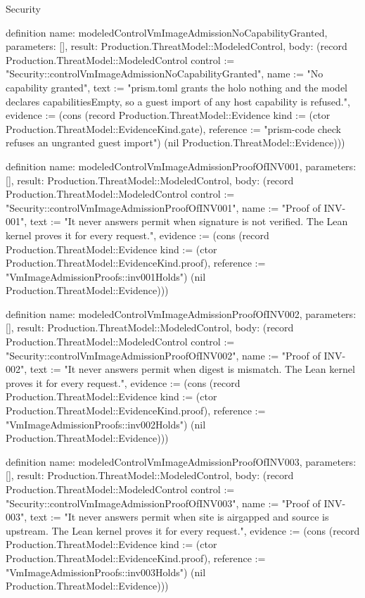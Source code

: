 \begin{lexlean}{Security}
\begin{semanticmodule}
definition{
  name: modeledControlVmImageAdmissionNoCapabilityGranted,
  parameters: [],
  result: Production.ThreatModel::ModeledControl,
  body: (record Production.ThreatModel::ModeledControl {control := "Security::controlVmImageAdmissionNoCapabilityGranted", name := "No capability granted", text := "prism.toml grants the holo nothing and the model declares capabilitiesEmpty, so a guest import of any host capability is refused.", evidence := (cons (record Production.ThreatModel::Evidence {kind := (ctor Production.ThreatModel::EvidenceKind.gate), reference := "prism-code check refuses an ungranted guest import"}) (nil Production.ThreatModel::Evidence))})
}

definition{
  name: modeledControlVmImageAdmissionProofOfINV001,
  parameters: [],
  result: Production.ThreatModel::ModeledControl,
  body: (record Production.ThreatModel::ModeledControl {control := "Security::controlVmImageAdmissionProofOfINV001", name := "Proof of INV-001", text := "It never answers permit when signature is not verified. The Lean kernel proves it for every request.", evidence := (cons (record Production.ThreatModel::Evidence {kind := (ctor Production.ThreatModel::EvidenceKind.proof), reference := "VmImageAdmissionProofs::inv001Holds"}) (nil Production.ThreatModel::Evidence))})
}

definition{
  name: modeledControlVmImageAdmissionProofOfINV002,
  parameters: [],
  result: Production.ThreatModel::ModeledControl,
  body: (record Production.ThreatModel::ModeledControl {control := "Security::controlVmImageAdmissionProofOfINV002", name := "Proof of INV-002", text := "It never answers permit when digest is mismatch. The Lean kernel proves it for every request.", evidence := (cons (record Production.ThreatModel::Evidence {kind := (ctor Production.ThreatModel::EvidenceKind.proof), reference := "VmImageAdmissionProofs::inv002Holds"}) (nil Production.ThreatModel::Evidence))})
}

definition{
  name: modeledControlVmImageAdmissionProofOfINV003,
  parameters: [],
  result: Production.ThreatModel::ModeledControl,
  body: (record Production.ThreatModel::ModeledControl {control := "Security::controlVmImageAdmissionProofOfINV003", name := "Proof of INV-003", text := "It never answers permit when site is airgapped and source is upstream. The Lean kernel proves it for every request.", evidence := (cons (record Production.ThreatModel::Evidence {kind := (ctor Production.ThreatModel::EvidenceKind.proof), reference := "VmImageAdmissionProofs::inv003Holds"}) (nil Production.ThreatModel::Evidence))})
}


\end{semanticmodule}
\end{lexlean}
